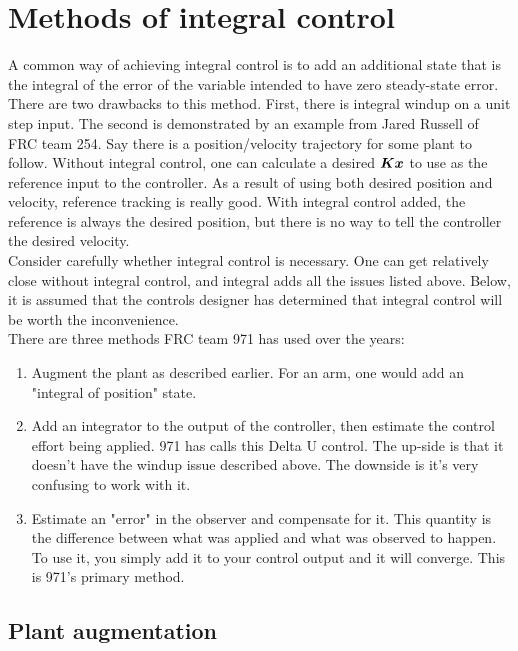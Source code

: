\section{Methods of integral control} \label{sec:integral_control}

A common way of achieving integral control is to add an additional state that is
the integral of the error of the variable intended to have zero steady-state
error. \\

There are two drawbacks to this method. First, there is integral windup on a
unit step input. The second is demonstrated by an example from Jared Russell of
FRC team 254. Say there is a position/velocity trajectory for some plant to
follow. Without integral control, one can calculate a desired $\bm K\bm x$
to use as the reference input to the controller. As a result of using both
desired position and velocity, reference tracking is really good. With integral
control added, the reference is always the desired position, but there is no way
to tell the controller the desired velocity. \\

Consider carefully whether integral control is necessary. One can get relatively
close without integral control, and integral adds all the issues listed above.
Below, it is assumed that the controls designer has determined that integral
control will be worth the inconvenience. \\

There are three methods FRC team 971 has used over the years:

\begin{enumerate}
  \item Augment the plant as described earlier. For an arm, one would add an
    "integral of position" state.
  \item Add an integrator to the output of the controller, then estimate the
    control effort being applied. 971 has calls this Delta U control. The
    up-side is that it doesn't have the windup issue described above. The
    downside is it's very confusing to work with it.
  \item Estimate an "error" in the observer and compensate for it. This quantity
    is the difference between what was applied and what was observed to happen.
    To use it, you simply add it to your control output and it will converge.
    This is 971's primary method.
\end{enumerate}

\subsection{Plant augmentation}

